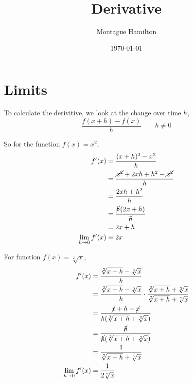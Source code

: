 \documentclass{article}
\begin{document}
\title{Derivative}
\author{Montague Hamilton}
\date{\today}
\maketitle

\section{Limits}
To calculate the derivitive, we look at the change over time $h$,
\[
  \frac{f(x+h)-f(x)}{h} \qquad h \neq 0
\]

So for the function $f(x) = x^{2}$,
\begin{align*}
  f'(x) &= \frac{(x+h)^{2} - x^{2}}{h} \\
        &= \frac{\cancel{x^{2}} + 2xh + h^{2} - \cancel{x^{2}}}{h} \\
        &= \frac{2xh + h^{2}}{h} \\
        &= \frac{\cancel{h}(2x + h)}{\cancel{h}} \\
        &= 2x + h \\
  \lim_{h \to 0} f'(x) &= 2x
\end{align*}

For function $f(x) = \sqrt[2]{x}$,
\begin{align*}
  f'(x) &= \frac{\sqrt[2]{x+h} - \sqrt[2]{x}}{h} \\
        &= \frac{\sqrt[2]{x+h} - \sqrt[2]{x}}{h} \cdot \frac{\sqrt[2]{x+h} + \sqrt[2]{x}}{\sqrt[2]{x+h} + \sqrt[2]{x}} \\
        &= \frac{\cancel{x} + h - \cancel{x}}{h(\sqrt[2]{x+h} + \sqrt[2]{x})} \\
        &= \frac{\cancel{h}}{\cancel{h}(\sqrt[2]{x+h} + \sqrt[2]{x})} \\
        &= \frac{1}{\sqrt[2]{x+h}+\sqrt[2]{x}} \\
  \lim_{h \to 0} f'(x) &= \frac{1}{2 \sqrt[2]{x}}
\end{align*}
\end{document}
